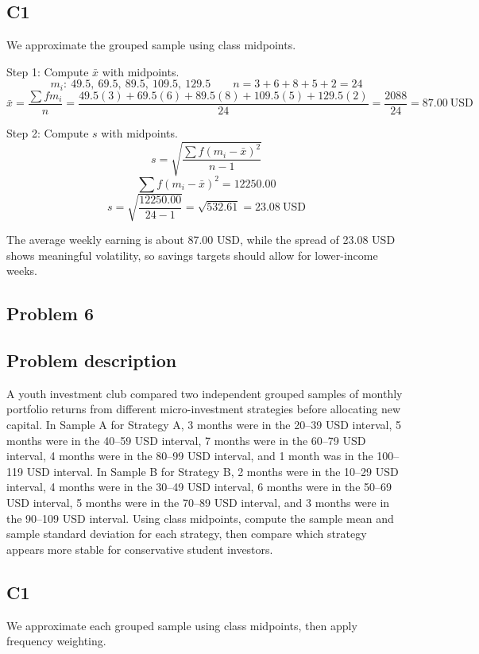 \begin{ExamProblems}
		\subsection*{C1}
		We approximate the grouped sample using class midpoints.

		Step 1: Compute $\bar{x}$ with midpoints.
		\[
		m_i:\ 49.5,\ 69.5,\ 89.5,\ 109.5,\ 129.5
		\qquad
		n = 3+6+8+5+2 = 24
		\]
		\[
		\bar{x} = \frac{\sum f m_i}{n}
		= \frac{49.5(3)+69.5(6)+89.5(8)+109.5(5)+129.5(2)}{24}
		= \frac{2088}{24}
		= 87.00\ \text{USD}
		\]

		Step 2: Compute $s$ with midpoints.
		\[
		s = \sqrt{\frac{\sum f(m_i-\bar{x})^2}{n-1}}
		\]
		\[
		\sum f(m_i-\bar{x})^2 = 12250.00
		\]
		\[
		s = \sqrt{\frac{12250.00}{24-1}} = \sqrt{532.61} = 23.08\ \text{USD}
		\]

		The average weekly earning is about 87.00 USD, while the spread of 23.08 USD shows meaningful volatility, so savings targets should allow for lower-income weeks.

		\newpage
		\item
		\subsection*{Problem 6}
		\subsection*{Problem description}
		A youth investment club compared two independent grouped samples of monthly portfolio returns from different micro-investment strategies before allocating new capital. In Sample A for Strategy A, 3 months were in the 20--39 USD interval, 5 months were in the 40--59 USD interval, 7 months were in the 60--79 USD interval, 4 months were in the 80--99 USD interval, and 1 month was in the 100--119 USD interval. In Sample B for Strategy B, 2 months were in the 10--29 USD interval, 4 months were in the 30--49 USD interval, 6 months were in the 50--69 USD interval, 5 months were in the 70--89 USD interval, and 3 months were in the 90--109 USD interval. Using class midpoints, compute the sample mean and sample standard deviation for each strategy, then compare which strategy appears more stable for conservative student investors.

		\subsection*{C1}
		We approximate each grouped sample using class midpoints, then apply frequency weighting.


\end{ExamProblems}
